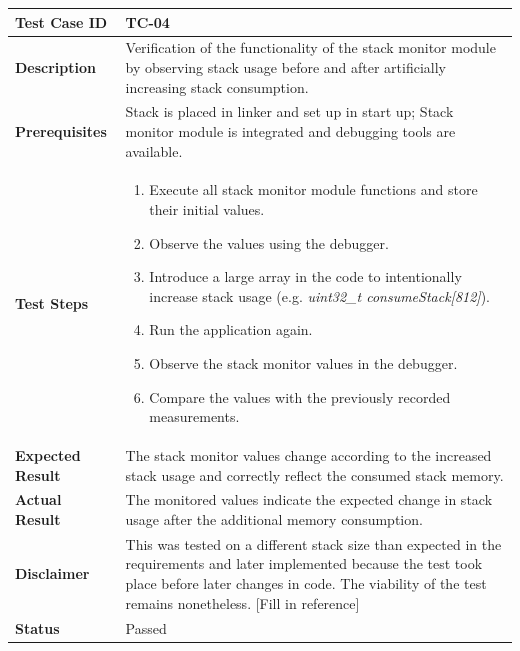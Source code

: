 \begin{table}[H]
\centering
\begin{tabular}{|p{3cm}|p{12cm}|}
\hline
\textbf{Test Case ID} & TC-04 \\ \hline
\textbf{Description} & Verification of the functionality of the stack monitor module by observing stack usage before and after artificially increasing stack consumption. \\ \hline
\textbf{Prerequisites} & Stack is placed in linker and set up in start up; Stack monitor module is integrated and debugging tools are available. \\ \hline
\textbf{Test Steps} &
\begin{enumerate}
\item Execute all stack monitor module functions and store their initial values.
\item Observe the values using the debugger.
\item Introduce a large array in the code to intentionally increase stack usage (e.g. \textit{uint32\_t consumeStack[812]}).
\item Run the application again.
\item Observe the stack monitor values in the debugger.
\item Compare the values with the previously recorded measurements.
\end{enumerate}
\\ \hline
\textbf{Expected Result} & The stack monitor values change according to the increased stack usage and correctly reflect the consumed stack memory. \\ \hline
\textbf{Actual Result} & The monitored values indicate the expected change in stack usage after the additional memory consumption. \\ \hline
\textbf{Disclaimer} & This was tested on a different stack size than expected in the requirements and later implemented because the test took place before later changes in code. The viability of the test remains nonetheless. [Fill in reference] \\ \hline
\textbf{Status} & \textcolor{green!60!black}{Passed} \\ \hline
\end{tabular}
\end{table}

